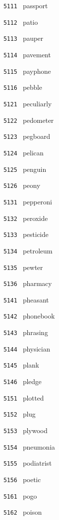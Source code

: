 \documentclass[11pt]{article}
\begin{document}
\begin{multicols}{6}
\small
\noindent \texttt{ 5111 } passport  \par
\noindent \texttt{ 5112 } patio  \par
\noindent \texttt{ 5113 } pauper  \par
\noindent \texttt{ 5114 } pavement  \par
\noindent \texttt{ 5115 } payphone  \par
\noindent \texttt{ 5116 } pebble  \par
\noindent \texttt{ 5121 } peculiarly  \par
\noindent \texttt{ 5122 } pedometer  \par
\noindent \texttt{ 5123 } pegboard  \par
\noindent \texttt{ 5124 } pelican  \par
\noindent \texttt{ 5125 } penguin  \par
\noindent \texttt{ 5126 } peony  \par
\noindent \texttt{ 5131 } pepperoni  \par
\noindent \texttt{ 5132 } peroxide  \par
\noindent \texttt{ 5133 } pesticide  \par
\noindent \texttt{ 5134 } petroleum  \par
\noindent \texttt{ 5135 } pewter  \par
\noindent \texttt{ 5136 } pharmacy  \par
\noindent \texttt{ 5141 } pheasant  \par
\noindent \texttt{ 5142 } phonebook  \par
\noindent \texttt{ 5143 } phrasing  \par
\noindent \texttt{ 5144 } physician  \par
\noindent \texttt{ 5145 } plank  \par
\noindent \texttt{ 5146 } pledge  \par
\noindent \texttt{ 5151 } plotted  \par
\noindent \texttt{ 5152 } plug  \par
\noindent \texttt{ 5153 } plywood  \par
\noindent \texttt{ 5154 } pneumonia  \par
\noindent \texttt{ 5155 } podiatrist  \par
\noindent \texttt{ 5156 } poetic  \par
\noindent \texttt{ 5161 } pogo  \par
\noindent \texttt{ 5162 } poison  \par

\end{multicols}
\end{document}
